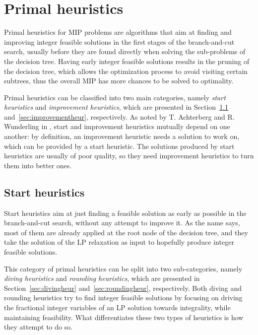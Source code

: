 \documentclass[a4paper,12pt,twoside]{scrbook}
\begin{document}
\chapter{Primal heuristics} \label{ch:primalheur}
Primal heuristics for MIP problems are algorithms that aim at finding and improving integer feasible solutions in the first stages of the branch-and-cut search, usually before they are found directly when solving the sub-problems of the decision tree. Having early integer feasible solutions results in the pruning of the decision tree, which allows the optimization process to avoid visiting certain subtrees, thus the overall MIP has more chances to be solved to optimality. \par 
Primal heuristics can be classified into two main categories, namely \textit{start heuristics} and \textit{improvement heuristics}, which are presented in Section~\ref{sec:startheur} and~\ref{sec:improvementheur}, respectively. As noted by T. Achterberg and R. Wunderling in \cite{achterberg2013}, start and improvement heuristics mutually depend on one another: by definition, an improvement heuristic needs a solution to work on, which can be provided by a start heuristic. The solutions produced by start heuristics are usually of poor quality, so they need improvement heuristics to turn them into better ones.

\section{Start heuristics} \label{sec:startheur}
Start heuristics aim at just finding a feasible solution as early as possible in the branch-and-cut search, without any attempt to improve it. As the name says, most of them are already applied at the root node of the decision tree, and they take the solution of the LP relaxation as input to hopefully produce integer feasible solutions. \par 
This category of primal heuristics can be split into two sub-categories, namely \textit{diving heuristics} and \textit{rounding heuristics}, which are presented in Section~\ref{sec:divingheur} and~\ref{sec:roundingheur}, respectively. Both diving and rounding heuristics try to find integer feasible solutions by focusing on driving the fractional integer variables of an LP solution towards integrality, while maintaining feasibility. What differentiates these two types of heuristics is how they attempt to do so.
\end{document}
